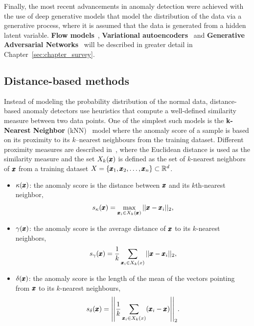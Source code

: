 Finally, the most recent advancements in anomaly detection were achieved with the use of deep generative models that model the distribution of the data via a generative process, where it is assumed that the data is generated from a hidden latent variable. \textbf{Flow models}~\cite{dinh2014nice}, \textbf{Variational autoencoders}~\cite{kingma2013vae} and \textbf{Generative Adversarial Networks}~\cite{goodfellow2014gan}  will be described in greater detail in Chapter~\ref{sec:chapter_survey}.

\subsection{Distance-based methods} \label{sec:distance_methods}
Instead of modeling the probability distribution of the normal data, distance-based anomaly detectors use heuristics that compute a well-defined similarity measure between two data points. One of the simplest such models is the \textbf{k-Nearest Neighbor} (kNN)~\cite{ramaswamy2000efficient} model where the anomaly score of a sample is based on its proximity to its $k$--nearest neighbours from the training dataset. Different proximity measures are described in~\cite{harmeling2006outliers}, where 
the Euclidean distance is used as the similarity measure and the set $X_{k}(\pmb{{x}})$ is defined as the set of $k$-nearest neighbors of $\pmb{{x}}$ from a training dataset $X = \lbrace \pmb{{x}}_1, \pmb{{x}}_2, \ldots, \pmb{{x}}_n \rbrace \subset \mathbb{R}^d$.
\begin{itemize}
	\item $\kappa(\pmb{{x}})$: the anomaly score is the distance between $\pmb{{x}}$ and its $k$th-nearest neighbor,
	\begin{equation} \label{eq:knn_kappa}
		s_{\kappa}(\pmb{{x}}) =  \max_{\pmb{{x}}_i \in X_k(\pmb{{x}})} \vert \vert \pmb{{x}} - \pmb{{x}}_i \vert \vert_2,
	\end{equation}
	\item $\gamma(\pmb{{x}})$: the anomaly score is the average distance of $\pmb{{x}}$ to its $k$-nearest neighbors, 
	\begin{equation} \label{eq:knn_gamma}
		s_{\gamma}(\pmb{{x}}) =  \frac{1}{k} \sum_{\pmb{{x}}_i \in X_k(x)} \vert \vert \pmb{{x}} - \pmb{{x}}_i \vert \vert_2,
	\end{equation}
	\item $\delta(\pmb{{x}})$: the anomaly score is the length of the mean of the vectors pointing from $\pmb{{x}}$ to its $k$-nearest neighbours,
	\begin{equation} \label{eq:knn_delta}
		s_{\delta}(\vc{x}) =  \left| \left| \frac{1}{k} \sum_{\vc{x}_i \in X_k(x)} (\vc{x}_i - \vc{x}) \right| \right|_2.
	\end{equation}
\end{itemize}
